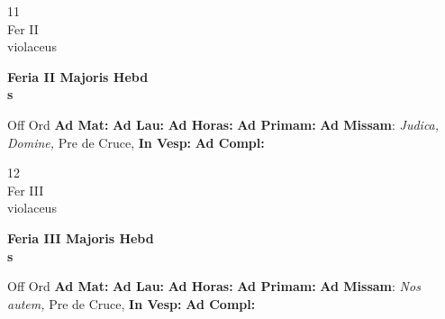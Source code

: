 \documentclass[10pt, openany]{book}
\begin{document}
    \begin{center}
        \begin{minipage}{3.5in}
            \vspace{2em}
            \begin{minipage}{0.5in}
                {\Huge 11} \\
                {\normalsize Fer II} \\
                {\normalsize violaceus}
            \end{minipage}
            \begin{minipage}{3.0in}
                \textbf{ \large Feria II Majoris Hebd \\
                \textnormal{\normalsize s}} \\ 
            \end{minipage}
            \begin{justify}Off Ord
                \textbf{Ad Mat: }
                \textbf{Ad Lau: }
                \textbf{Ad Horas: }
                \textbf{Ad Primam: }\textbf{Ad Missam}: \textit{Judica, Domine,} Pre de Cruce,  
                \textbf{In Vesp: }
                \textbf{Ad Compl: }
            \end{justify}
        \end{minipage}
    \end{center}

    \begin{center}
        \begin{minipage}{3.5in}
            \vspace{2em}
            \begin{minipage}{0.5in}
                {\Huge 12} \\
                {\normalsize Fer III} \\
                {\normalsize violaceus}
            \end{minipage}
            \begin{minipage}{3.0in}
                \textbf{ \large Feria III Majoris Hebd \\
                \textnormal{\normalsize s}} \\ 
            \end{minipage}
            \begin{justify}Off Ord
                \textbf{Ad Mat: }
                \textbf{Ad Lau: }
                \textbf{Ad Horas: }
                \textbf{Ad Primam: }\textbf{Ad Missam}: \textit{Nos autem,} Pre de Cruce,  
                \textbf{In Vesp: }
                \textbf{Ad Compl: }
            \end{justify}
        \end{minipage}
    \end{center}
\end{document}
